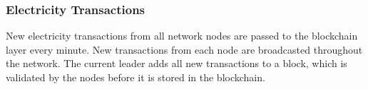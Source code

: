 \subsubsection*{Electricity Transactions}
New electricity transactions from all network nodes are passed to the blockchain layer every minute. New transactions from each node are broadcasted throughout the network. The current leader adds all new transactions to a block, which is validated by the nodes before it is stored in the blockchain. 









